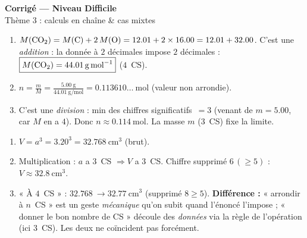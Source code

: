 \documentclass[11pt,a4paper]{article}
\newcommand{\CS}{chiffres significatifs}
\begin{document}
\begin{center}
{\Large\bfseries\color{primarydark} Corrigé — Niveau Difficile}\\[1pt]
{\color{primary} Thème 3 : calculs en chaîne \& cas mixtes}
\end{center}
\vspace{2mm}

\begin{cor}
\begin{enumerate}[label=\alph*),leftmargin=1.6em,itemsep=1pt]
  \item $M(\ce{CO2})=M(\ce{C})+2\,M(\ce{O})=\num{12,01}+2\times\num{16,00}=\num{12,01}+\num{32,00}$.
        C'est une \emph{addition} : la donnée à $2$ décimales impose $2$ décimales :
        $\boxed{M(\ce{CO2})=\qty{44,01}{\gram\per\mole}}$ ($4$~CS).
  \item $\displaystyle n=\frac{m}{M}=\frac{\qty{5,00}{\gram}}{\qty{44,01}{\gram\per\mole}}
        =\num{0,113610}\ldots\ \si{\mole}$ (valeur non arrondie).
  \item C'est une \emph{division} : min des \CS\ $=3$ (venant de $m=\num{5,00}$, car $M$ en a $4$).
        Donc $\boxed{n\approx\qty{0,114}{\mole}}$. La masse $m$ ($3$~CS) fixe la limite.
\end{enumerate}
\end{cor}

\begin{cor}
\begin{enumerate}[label=\alph*),leftmargin=1.6em,itemsep=1pt]
  \item $V=a^3=\num{3,20}^3=\qty{32,768}{\centi\metre\cubed}$ (brut).
  \item Multiplication : $a$ a $3$~CS $\Rightarrow V$ a $3$~CS. Chiffre supprimé $6\,(\ge5)$ :
        $\boxed{V\approx\qty{32,8}{\centi\metre\cubed}}$.
  \item « À $4$~CS » : $\qty{32,768}{}\to\qty{32,77}{\centi\metre\cubed}$ (supprimé $8\ge5$).
        \textbf{Différence :} « arrondir à $n$~CS » est un geste \emph{mécanique} qu'on subit quand
        l'énoncé l'impose ; « donner le bon nombre de CS » découle des \emph{données} via la règle de
        l'opération (ici $3$~CS). Les deux ne coïncident pas forcément.
\end{enumerate}
\end{cor}
\end{document}
